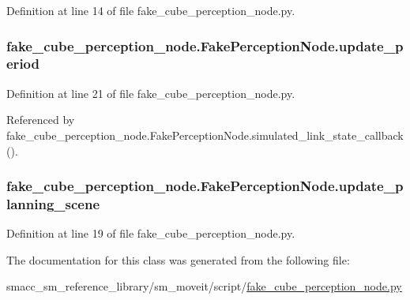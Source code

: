 Definition at line 14 of file fake\+\_\+cube\+\_\+perception\+\_\+node.\+py.

\subsubsection[{\texorpdfstring{update\+\_\+period}{update_period}}]{\setlength{\rightskip}{0pt plus 5cm}fake\+\_\+cube\+\_\+perception\+\_\+node.\+Fake\+Perception\+Node.\+update\+\_\+period}\hypertarget{classfake__cube__perception__node_1_1FakePerceptionNode_a3df1532cfe1c0b4ed99346a498150c73}{}\label{classfake__cube__perception__node_1_1FakePerceptionNode_a3df1532cfe1c0b4ed99346a498150c73}


Definition at line 21 of file fake\+\_\+cube\+\_\+perception\+\_\+node.\+py.



Referenced by fake\+\_\+cube\+\_\+perception\+\_\+node.\+Fake\+Perception\+Node.\+simulated\+\_\+link\+\_\+state\+\_\+callback().

\subsubsection[{\texorpdfstring{update\+\_\+planning\+\_\+scene}{update_planning_scene}}]{\setlength{\rightskip}{0pt plus 5cm}fake\+\_\+cube\+\_\+perception\+\_\+node.\+Fake\+Perception\+Node.\+update\+\_\+planning\+\_\+scene}\hypertarget{classfake__cube__perception__node_1_1FakePerceptionNode_a67b87c9f077aefedf69f3e6d9b29ea94}{}\label{classfake__cube__perception__node_1_1FakePerceptionNode_a67b87c9f077aefedf69f3e6d9b29ea94}


Definition at line 19 of file fake\+\_\+cube\+\_\+perception\+\_\+node.\+py.



The documentation for this class was generated from the following file\+:\begin{DoxyCompactItemize}
\item 
smacc\+\_\+sm\+\_\+reference\+\_\+library/sm\+\_\+moveit/script/\hyperlink{fake__cube__perception__node_8py}{fake\+\_\+cube\+\_\+perception\+\_\+node.\+py}\end{DoxyCompactItemize}
